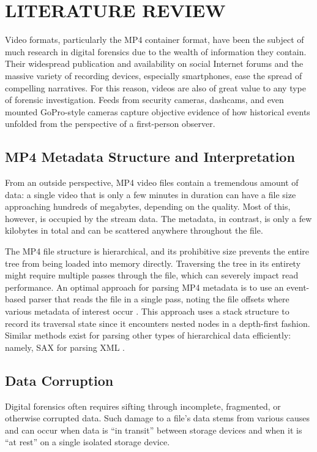 \chapter{\uppercase{Literature Review}}

Video formats, particularly the MP4 container format, have been the subject of much research in digital forensics due to the wealth of information they contain. Their widespread publication and availability on social Internet forums and the massive variety of recording devices, especially smartphones, ease the spread of compelling narratives. For this reason, videos are also of great value to any type of forensic investigation. Feeds from security cameras, dashcams, and even mounted GoPro-style cameras capture objective evidence of how historical events unfolded from the perspective of a first-person observer.

\section{MP4 Metadata Structure and Interpretation}

From an outside perspective, MP4 video files contain a tremendous amount of data: a single video that is only a few minutes in duration can have a file size approaching hundreds of megabytes, depending on the quality. Most of this, however, is occupied by the stream data. The metadata, in contrast, is only a few kilobytes in total and can be scattered anywhere throughout the file.

The MP4 file structure is hierarchical, and its prohibitive size prevents the entire tree from being loaded into memory directly. Traversing the tree in its entirety might require multiple passes through the file, which can severely impact read performance. An optimal approach for parsing MP4 metadata is to use an event-based parser that reads the file in a single pass, noting the file offsets where various metadata of interest occur \cite{zhao2010}. This approach uses a stack structure to record its traversal state since it encounters nested nodes in a depth-first fashion. Similar methods exist for parsing other types of hierarchical data efficiently: namely, SAX for parsing XML \cite{fegaras2004}.

\section{Data Corruption}

Digital forensics often requires sifting through incomplete, fragmented, or otherwise corrupted data. Such damage to a file's data stems from various causes and can occur when data is ``in transit'' between storage devices and when it is ``at rest'' on a single isolated storage device.


